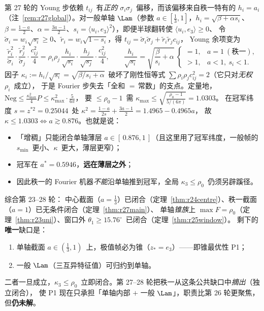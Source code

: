 第 27 轮的 Young 步依赖 $t_{ij}$~有\emph{正的} $\sigma_i\sigma_j$~偏移，而该偏移来自秩一特有的 $h_i=a_i$
（注~\ref{rem:r27global}）。对一般单轴 $\Lam$（参数 $a\in[\frac13,1]$，$h_i=\sqrt{\beta+\alpha s_i}$、
$\beta=\frac{1-a}2$、$\alpha=\frac{3a-1}2$、$s_i=\langle u_i,e_3\rangle^2$），即便半球翻转使 $\langle u_i,e_3\rangle\ge0$、
令 $\widetilde\sigma_i=w_i\sqrt{s_i}\ge0$、$\widetilde r_i=w_i\sqrt{1-s_i}$，得 $t_{ij}=\widetilde\sigma_i\widetilde\sigma_j+\widetilde r_i\widetilde r_jc_{ij}$，
Young 余项变为
\begin{equation}\label{eq:r28young}
\frac{\widetilde r_i^2}{\widetilde\sigma_i}\cdot\frac{\widetilde r_j^2}{\widetilde\sigma_j}\cdot\frac{c_{ij}^2}4
=\rho_i\rho_j\,\frac{h_i}{\sqrt{s_i}}\cdot\frac{h_j}{\sqrt{s_j}}\cdot\frac{c_{ij}^2}4,
\qquad \frac{h_i}{\sqrt{s_i}}=\sqrt{\frac\beta{s_i}+\alpha}\ \begin{cases}=1,&a=1\ (\text{秩一}),\\ >1,&a<1,\ s_i<1.\end{cases}
\end{equation}
因子 $\kappa_i:=h_i/\sqrt{s_i}=\sqrt{\beta/s_i+\alpha}$~破坏了刚性恒等式
$\sum\rho_i\rho_jc_{ij}^2=2$（它只对\emph{无权} $\rho_i$~成立），
于是 Fourier 步失去「全和 $=$\,常数」的支点。定量地，
$\mathrm{Neg}\le\frac{\kappa_{\max}^2}4P\le\kappa_{\max}^2\cdot\frac5{6\pi}$，
要 $\le\rho_0-1$~需 $\kappa_{\max}\le\sqrt{\frac{\rho_0-1}{5/(6\pi)}}=1.0303$。
在冠军纬度 $s=z^{*2}=0.25044$~处 $\kappa^2=\frac{1-a}{2s}+\frac{3a-1}2=1.4965-0.4965a$，
故 $\kappa\le1.0303\iff a\gtrsim0.876$。也就是说：
\begin{itemize}\itemsep=1pt
\item 「增稠」只能闭合单轴薄层 $a\in[\,0.876,1\,]$（且这里用了冠军纬度，一般帧的 $s_{\min}$~更小、$\kappa$~更大，薄层更窄）；
\item 冠军在 $a^*=0.5946$，\textbf{远在薄层之外}；
\item 因此秩一的 Fourier 机器\emph{不能}沿单轴推到冠军，全局 $\kappa_3\le\rho_0$~仍须另辟蹊径。
\end{itemize}

\begin{remark}[全局的唯一关键路径]\label{rem:r28path}
综合第 23--28 轮：
中心截面（$a=\frac13$）已闭合（定理~\ref{thm:r24centre}）、秩一截面（$a=1$）已无条件闭合（定理~\ref{thm:r27main}）、
单轴\emph{锥族}上 $\max F=\rho_0$（定理~\ref{thm:r23uni}）、窗口外 $\theta_1\ge15.76^\circ$~已闭合（定理~\ref{thm:r25window}）。
剩下的\textbf{唯一}缺口是：
\begin{enumerate}\itemsep=1pt
\item 单轴截面 $a\in(\frac13,1)$~上，极值帧必为锥（$z_*=e_3$）——即锥最优性 P1；
\item 一般 $\Lam$（三互异特征值）可归约到单轴。
\end{enumerate}
二者一旦成立，$\kappa_3\le\rho_0$~立即闭合。第 27--28 轮把秩一从这条公共缺口中\emph{摘出}（独立闭合），
使 P1 现在只承担「单轴内部 $+$ 一般 $\Lam$」，职责比第 26 轮更聚焦，但\textbf{仍未解}。
\end{remark}

